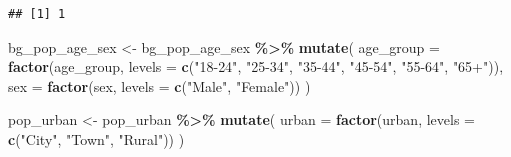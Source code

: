 \documentclass[
]{article}
\newenvironment{Shaded}{\begin{snugshade}}{\end{snugshade}}
\newcommand{\AttributeTok}[1]{\textcolor[rgb]{0.13,0.29,0.53}{#1}}
\newcommand{\DecValTok}[1]{\textcolor[rgb]{0.00,0.00,0.81}{#1}}
\newcommand{\FunctionTok}[1]{\textcolor[rgb]{0.13,0.29,0.53}{\textbf{#1}}}
\newcommand{\NormalTok}[1]{#1}
\newcommand{\OtherTok}[1]{\textcolor[rgb]{0.56,0.35,0.01}{#1}}
\newcommand{\SpecialCharTok}[1]{\textcolor[rgb]{0.81,0.36,0.00}{\textbf{#1}}}
\newcommand{\StringTok}[1]{\textcolor[rgb]{0.31,0.60,0.02}{#1}}
\begin{document}
\begin{Shaded}
\end{Shaded}

\begin{verbatim}
## [1] 1
\end{verbatim}

\begin{Shaded}
\begin{Highlighting}[]
\NormalTok{bg\_pop\_age\_sex }\OtherTok{\textless{}{-}}\NormalTok{ bg\_pop\_age\_sex }\SpecialCharTok{\%\textgreater{}\%}
  \FunctionTok{mutate}\NormalTok{(}
    \AttributeTok{age\_group =} \FunctionTok{factor}\NormalTok{(age\_group,}
      \AttributeTok{levels =} \FunctionTok{c}\NormalTok{(}\StringTok{"18{-}24"}\NormalTok{, }\StringTok{"25{-}34"}\NormalTok{, }\StringTok{"35{-}44"}\NormalTok{, }\StringTok{"45{-}54"}\NormalTok{, }\StringTok{"55{-}64"}\NormalTok{, }\StringTok{"65+"}\NormalTok{)),}
    \AttributeTok{sex =} \FunctionTok{factor}\NormalTok{(sex,}
      \AttributeTok{levels =} \FunctionTok{c}\NormalTok{(}\StringTok{"Male"}\NormalTok{, }\StringTok{"Female"}\NormalTok{))}
\NormalTok{  )}

\NormalTok{pop\_urban }\OtherTok{\textless{}{-}}\NormalTok{ pop\_urban }\SpecialCharTok{\%\textgreater{}\%}
  \FunctionTok{mutate}\NormalTok{(}
    \AttributeTok{urban =} \FunctionTok{factor}\NormalTok{(urban,}
      \AttributeTok{levels =} \FunctionTok{c}\NormalTok{(}\StringTok{"City"}\NormalTok{, }\StringTok{"Town"}\NormalTok{, }\StringTok{"Rural"}\NormalTok{))}
\NormalTok{  )}
\end{Highlighting}
\end{Shaded}
\end{document}
